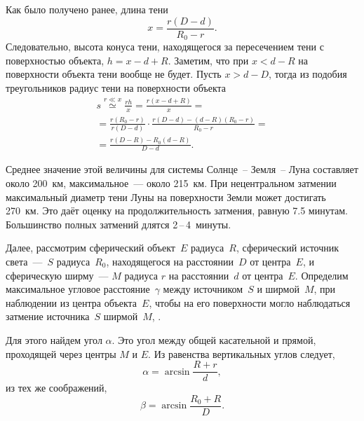Как было получено ранее, длина тени
\begin{equation*}
    x = \frac{r (D - d)}{R_0 - r}.
\end{equation*}
Следовательно, высота конуса тени, находящегося за пересечением тени с поверхностью объекта, $h = x - d + R$. Заметим, что при $x < d - R$ на поверхности объекта тени вообще не будет. Пусть $x > d - D$, тогда из подобия треугольников радиус тени на поверхности объекта
\begin{multline}
    s 
        \overset{r \ll x}{\simeq} \frac{r h}{x} 
        = \frac{r(x - d + R)}{x} = \\
        = \frac{r (R_0 - r)}{r (D - d)} \cdot \frac{r(D - d) - (d - R)(R_0 - r)}{R_0 - r} = \\
        = \frac{r (D - R) - R_0 (d - R)}{D - d}.
\end{multline}

Среднее значение этой величины для системы Солнце~-- Земля~-- Луна составляет около 200~км, максимальное~--- около 215~км. При нецентральном затмении максимальный диаметр тени Луны на поверхности Земли может достигать 270~км. Это даёт оценку на продолжительность затмения, равную 7.5 минутам. Большинство полных затмений длятся 2\,--\,4~минуты.

Далее, рассмотрим сферический объект~$E$ радиуса~$R$, сферический источник света~---~$S$ радиуса~$R_0$, находящегося на расстоянии~$D$ от центра~$E$, и сферическую ширму~--- $M$ радиуса $r$ на расстоянии~$d$ от центра~$E$. Определим максимальное угловое расстояние~$\gamma$ между источником~$S$ и ширмой~$M$, при наблюдении из центра объекта~$E$, чтобы на его поверхности могло наблюдаться  затмение источника~$S$ ширмой~$M$, .

\begin{figure}[h!]
    \centering
    
    \caption{}
    \label{pic:eclipse-vertical-distance}
\end{figure}

Для этого найдем угол $\alpha$. Это угол между общей касательной и прямой, проходящей через центры $M$ и $E$. Из равенства вертикальных углов следует, 
\begin{equation}
    \alpha = \arcsin \frac{R + r}{d},
    \label{eq:eclipses-vertial-distance-alpha}
\end{equation}
из тех же соображений,
\begin{equation*}
    \beta = \arcsin \frac{R_0 + R}{D}.
\end{equation*}

